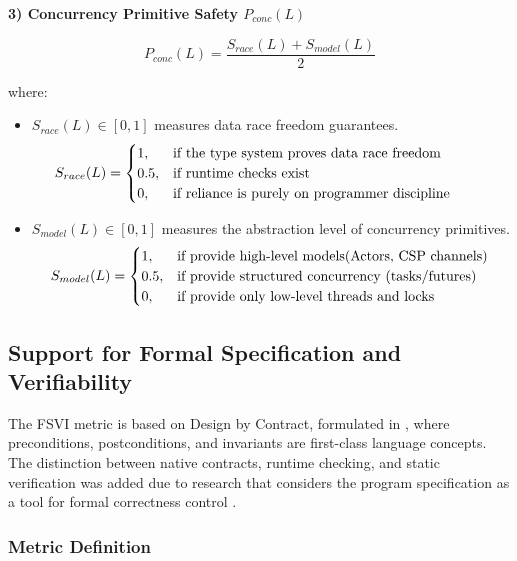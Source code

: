 \textbf{3) Concurrency Primitive Safety $P_{conc}(L)$}

\[
P_{conc}(L) = \frac{S_{race}(L) + S_{model}(L)}{2}
\]

where:
\begin{itemize}
    \item $S_{race}(L) \in [0,1]$ measures data race freedom guarantees.
    \[
    S_{race}(L) = 
    \begin{cases} 
    1, & \text{\parbox[t]{0.65\linewidth}{\raggedright
            if the type system proves data race freedom%
         }} \\
    0.5, & \text{\parbox[t]{0.65\linewidth}{\raggedright
            if runtime checks exist%
         }} \\
    0, & \text{\parbox[t]{0.65\linewidth}{\raggedright
            if reliance is purely on programmer discipline%
         }}
    \end{cases}
    \]
    \item $S_{model}(L) \in [0,1]$ measures the abstraction level of concurrency primitives. 
    \[
    S_{model}(L) = 
    \begin{cases} 
    1, & \text{\parbox[t]{0.65\linewidth}{\raggedright
            if provide high-level models(Actors, CSP channels)%
         }} \\
    0.5, & \text{\parbox[t]{0.65\linewidth}{\raggedright
            if provide structured concurrency (tasks/futures)%
         }} \\
    0, & \text{\parbox[t]{0.65\linewidth}{\raggedright
            if provide only low-level threads and locks%
         }}
    \end{cases}
    \]
\end{itemize}

\subsection{Support for Formal Specification and Verifiability}

The FSVI metric is based on Design by Contract, formulated in \cite{meyer2002applying}, where preconditions, postconditions, and invariants are first-class language concepts. The distinction between native contracts, runtime checking, and static verification was added due to research that considers the program specification as a tool for formal correctness control \cite{meyer2002applying}.

\subsubsection{Metric Definition}

